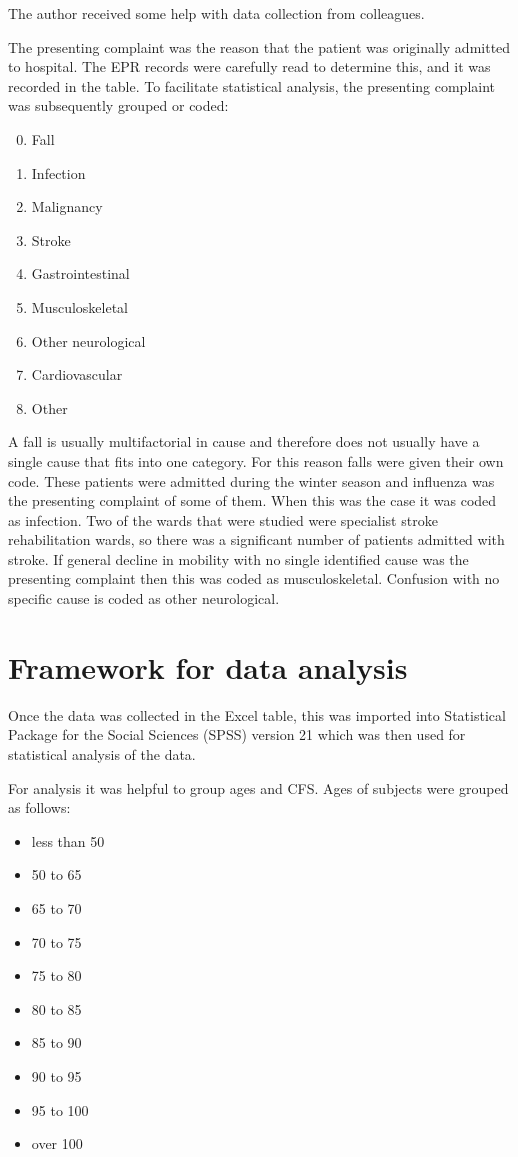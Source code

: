 \documentclass
[
	12pt,
	a4paper,
	oneside,
]{report}
\begin{document}
The author received some help with data collection from colleagues.

The presenting complaint was the reason that the patient was originally 
admitted to hospital. The EPR records were carefully read to determine this,
and it was recorded in the table. To facilitate statistical analysis, the 
presenting complaint was subsequently grouped or coded:
\begin{enumerate}
\setcounter{enumi}{-1}
\item Fall
\item Infection
\item Malignancy
\item Stroke
\item Gastrointestinal
\item Musculoskeletal
\item Other neurological
\item Cardiovascular
\item Other
\end{enumerate}

A fall is usually multifactorial in cause \parencite{silver:12} and therefore
does not usually have a single cause that fits into one category. For this 
reason falls were given their own code.
These patients were admitted during the winter season and influenza was the
presenting complaint of some of them. When this was the case it was coded as
infection. Two of the wards that were studied were specialist stroke 
rehabilitation wards, so there was a significant number of patients admitted
with stroke. If general decline in mobility with no single identified cause
was the presenting complaint then this was coded as musculoskeletal.
Confusion with no specific cause is coded as other neurological.



\section{Framework for data analysis}

Once the data was collected in the Excel table, this was imported into 
Statistical Package for the Social Sciences (SPSS) version 21 which was then
used for statistical analysis of the data.

For analysis it was helpful to group ages and CFS. Ages of subjects were 
grouped as follows:
\begin{itemize}
	\item less than 50
	\item 50 to 65
	\item 65 to 70
	\item 70 to 75
 	\item 75 to 80
	\item 80 to 85
 	\item 85 to 90
 	\item 90 to 95
 	\item 95 to 100
 	\item over 100
\end{itemize}
\end{document}
